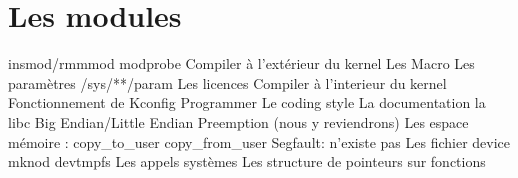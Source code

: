 %
%
%

\part{Les modules}

  insmod/rmmmod
  modprobe
  Compiler à l'extérieur du kernel
  Les Macro
    Les paramètres
    /sys/**/param
  Les licences
  Compiler à l'interieur du kernel
  Fonctionnement de Kconfig
  Programmer
    Le coding style
    La documentation
    la libc
    Big Endian/Little Endian
    Preemption (nous y reviendrons)
    Les espace mémoire : copy_to_user copy_from_user
    Segfault: n'existe pas
  Les fichier device
    mknod
    devtmpfs
  Les appels systèmes
  Les structure de pointeurs sur fonctions



